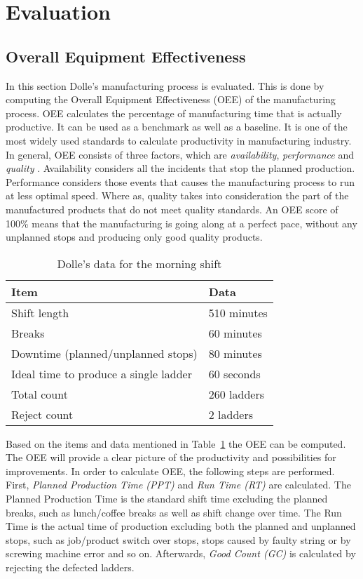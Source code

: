 \documentclass[runningheads]{llncs}
\begin{document}
\section {Evaluation}
\label{sec:evaluation}
\subsection{Overall Equipment Effectiveness}
In this section Dolle's manufacturing process is evaluated. This is done by computing the Overall Equipment Effectiveness (OEE) of the manufacturing process. OEE calculates the percentage of manufacturing time that is actually productive. It can be used as a benchmark as well as a baseline. It is one of the most widely used standards to calculate productivity in manufacturing industry. In general, OEE consists of three factors, which are \emph{availability}, \emph{performance} and \emph{quality} \cite{oee}. Availability considers all the incidents that stop the planned production. Performance considers those events that causes the manufacturing process to run at less optimal speed. Where as, quality takes into consideration the part of the manufactured products that do not meet quality standards. An OEE score of 100\% means that the manufacturing is going along at a perfect pace, without any unplanned stops and producing only good quality products. 

\begin{table}[]
\label{tab:distance}
\centering
\caption{Dolle's data for the morning shift}
\begin{tabular}{p{5.7cm}|p{5.7cm}}
\hline
\multicolumn{1}{l}{\textbf{Item}} &  \textbf{Data} \\ \hline
Shift length            & 510 minutes\\
Breaks           &  60 minutes\\
Downtime (planned/unplanned stops)            &   80 minutes\\
Ideal time to produce a single ladder   &   60 seconds\\
Total count  & 260 ladders\\
Reject count & 2 ladders\\

\hline
\end{tabular}
\label{tab:data}
\end{table}

Based on the items and data mentioned in Table~\ref{tab:data} the OEE can be computed. The OEE will provide a clear picture of the productivity and possibilities for improvements. In order to calculate OEE, the following steps are performed. First, \emph{Planned Production Time (PPT)} and \emph{Run Time (RT)} are calculated. The Planned Production Time is the standard shift time excluding the planned breaks, such as lunch/coffee breaks as well as shift change over time. The Run Time is the actual time of production excluding both the planned and unplanned stops, such as job/product switch over stops, stops caused by faulty string or by screwing machine error and so on. Afterwards, \emph{Good Count (GC)} is calculated by rejecting the defected ladders.\\
\end{document}
